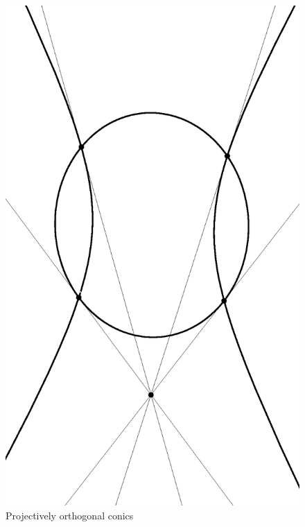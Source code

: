 \begin{figure}[!htb]
\centering
\includegraphics[scale=0.5,angle=270]{orthogonal.eps}
\caption{Projectively orthogonal conics}
\end{figure}

